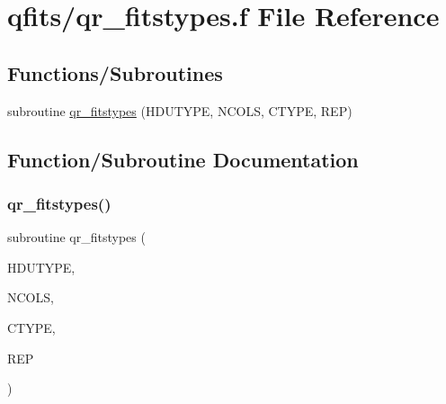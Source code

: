 \hypertarget{qr__fitstypes_8f}{}\section{qfits/qr\+\_\+fitstypes.f File Reference}
\label{qr__fitstypes_8f}
\subsection*{Functions/\+Subroutines}
\begin{DoxyCompactItemize}
\item 
subroutine \hyperlink{qr__fitstypes_8f_a06794d2a1fbaff26f25736a1d905e7ae}{qr\+\_\+fitstypes} (H\+D\+U\+T\+Y\+PE, N\+C\+O\+LS, C\+T\+Y\+PE, R\+EP)
\end{DoxyCompactItemize}


\subsection{Function/\+Subroutine Documentation}
\mbox{\label{qr__fitstypes_8f_a06794d2a1fbaff26f25736a1d905e7ae}} 
\subsubsection{\texorpdfstring{qr\+\_\+fitstypes()}{qr\_fitstypes()}}
{\footnotesize\ttfamily subroutine qr\+\_\+fitstypes (\begin{DoxyParamCaption}\item[{integer}]{H\+D\+U\+T\+Y\+PE,  }\item[{integer}]{N\+C\+O\+LS,  }\item[{integer, dimension(ncols)}]{C\+T\+Y\+PE,  }\item[{integer, dimension(ncols)}]{R\+EP }\end{DoxyParamCaption})}

